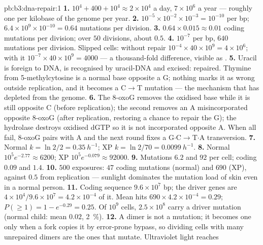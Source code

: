\begin{solution}{pb:b3:dna-repair:1}
\textbf{1.} $10^{4} + 400 + 10^{4} \approx 2\times 10^{4}$  a
day, $7\times 10^{6}$ a year --- roughly one per kilobase of the genome
per year.
\textbf{2.} $10^{-5}\times 10^{-2}\times 10^{-3} = 10^{-10}$ per bp;
$6.4\times 10^{9}\times 10^{-10} = 0.64$ mutations per division.
\textbf{3.} $0.64\times 0.015 \approx 0.01$ coding mutations per
division; over $50$ divisions, about $0.5$.
\textbf{4.} $10^{-7}$ per bp, $640$ mutations per division. Slipped
cells: without repair $10^{-4}\times 40\times 10^{9} = 4\times 10^{6}$;
with it $10^{-7}\times 40\times 10^{9} = 4000$ --- a thousand-fold
difference, visible as .
\textbf{5.} Uracil is foreign to DNA, is recognised by uracil-DNA
 and excised: repaired. Thymine from 5-methylcytosine is a
normal base opposite a G; nothing marks it as wrong outside replication,
and it becomes a C$\to$T mutation --- the mechanism that has depleted
 from the genome.
\textbf{6.} The 8-oxoG  removes the oxidised base while it is
still opposite C (before replication); the second  removes
an A misincorporated opposite 8-oxoG (after replication, restoring a
chance to repair the G); the hydrolase destroys oxidised dGTP so it is
not incorporated opposite A. When all fail, 8-oxoG pairs with A and the
next round fixes a G$\cdot$C$\to$T$\cdot$A transversion.
\textbf{7.} Normal $k = \ln 2/2 = \qty{0.35}{h^{-1}}$; XP $k = \ln 2/70
= \qty{0.0099}{h^{-1}}$.
\textbf{8.} Normal $10^{5} e^{-2.77} \approx 6200$; XP $10^{5}
e^{-0.079} \approx \num{92000}$.
\textbf{9.} Mutations $6.2$ and $92$ per cell; coding $0.09$ and $1.4$.
\textbf{10.} $500$ exposures: $47$ coding mutations (normal) and $690$
(XP), against $0.5$ from replication --- sunlight dominates the
mutation load of skin even in a normal person.
\textbf{11.} Coding sequence $9.6\times 10^{7}$ bp; the driver genes
are $4\times 10^{4}/9.6\times 10^{7} = 4.2\times 10^{-4}$ of it. Mean
hits $690\times 4.2\times 10^{-4} = 0.29$; $P(\ge 1) = 1 - e^{-0.29} =
0.25$. Of $10^{9}$ cells, $2.5\times 10^{8}$ carry a driver mutation
(normal child: mean $0.02$, \qty{2}{\%}).
\textbf{12.} A dimer is not a mutation; it becomes one only when a
fork copies it by error-prone bypass, so dividing cells with many
unrepaired dimers are the ones that mutate. Ultraviolet light reaches

\end{solution}
